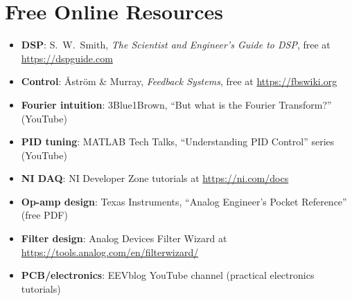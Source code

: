 \documentclass[11pt,letterpaper,twoside,openany]{book}
\begin{document}
\section*{Free Online Resources}
\begin{itemize}[leftmargin=1.5em]
\item \textbf{DSP}: S.~W.~Smith, \emph{The Scientist and Engineer's Guide to DSP}, free at \url{https://dspguide.com}
\item \textbf{Control}: \r{A}str\"{o}m \& Murray, \emph{Feedback Systems}, free at \url{https://fbswiki.org}
\item \textbf{Fourier intuition}: 3Blue1Brown, ``But what is the Fourier Transform?'' (YouTube)
\item \textbf{PID tuning}: MATLAB Tech Talks, ``Understanding PID Control'' series (YouTube)
\item \textbf{NI DAQ}: NI Developer Zone tutorials at \url{https://ni.com/docs}
\item \textbf{Op-amp design}: Texas Instruments, ``Analog Engineer's Pocket Reference'' (free PDF)
\item \textbf{Filter design}: Analog Devices Filter Wizard at \url{https://tools.analog.com/en/filterwizard/}
\item \textbf{PCB/electronics}: EEVblog YouTube channel (practical electronics tutorials)
\end{itemize}

\printindex
\end{document}
